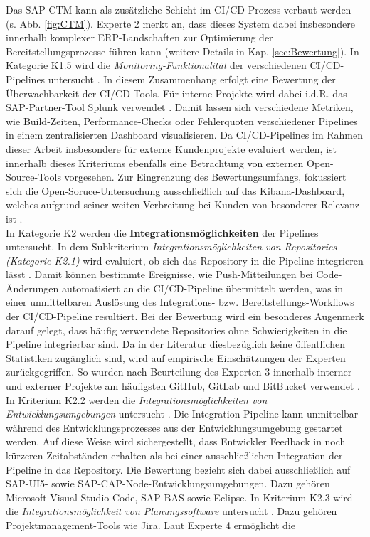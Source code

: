 Das SAP CTM kann als zusätzliche Schicht im CI/CD-Prozess verbaut werden (s. Abb. \ref{fig:CTM}). Experte 2 merkt an, dass dieses System dabei insbesondere innerhalb komplexer ERP-Landschaften zur Optimierung der Bereitstellungsprozesse führen kann (weitere Details in Kap. \ref{sec:Bewertung})\cite[Z. 65 ff.]{ProductManagerSAPHyperspaceCICD.}. In Kategorie K1.5 wird die \textit{Monitoring-Funktionalität} der verschiedenen CI/CD-Pipelines untersucht \cite[Z. 37 ff.]{ProductManagerSAPHyperspaceCICD.}. In diesem Zusammenhang erfolgt eine Bewertung der Überwachbarkeit der CI/CD-Tools. Für interne Projekte wird dabei i.d.R. das SAP-Partner-Tool Splunk verwendet \cite[Z. 74 ff.]{ProductManagerSAPHyperspaceCICD.}. Damit lassen sich verschiedene Metriken, wie Build-Zeiten, Performance-Checks oder Fehlerquoten verschiedener Pipelines in einem zentralisierten Dashboard visualisieren. Da CI/CD-Pipelines im Rahmen dieser Arbeit insbesondere für externe Kundenprojekte evaluiert werden, ist innerhalb dieses Kriteriums ebenfalls eine Betrachtung von externen Open-Source-Tools vorgesehen. Zur Eingrenzung des Bewertungsumfangs, fokussiert sich die Open-Soruce-Untersuchung ausschließlich auf das Kibana-Dashboard, welches aufgrund seiner weiten Verbreitung bei Kunden von besonderer Relevanz ist \cite[Z. 74 ff.]{ProductManagerSAPHyperspaceCICD.}.\\In Kategorie K2 werden die \textbf{Integrationsmöglichkeiten} der Pipelines untersucht. In dem Subkriterium \textit{Integrationsmöglichkeiten von Repositories (Kategorie K2.1)} wird evaluiert, ob sich das Repository in die Pipeline integrieren lässt \cite[Z. 89 ff.]{ProductOwnerSAPBTPProd&Infra.}. Damit können bestimmte Ereignisse, wie Push-Mitteilungen bei Code-Änderungen automatisiert an die CI/CD-Pipeline übermittelt werden, was in einer unmittelbaren Auslösung des Integrations- bzw. Bereitstellungs-Workflows der CI/CD-Pipeline resultiert. Bei der Bewertung wird ein besonderes Augenmerk darauf gelegt, dass häufig verwendete Repositories ohne Schwierigkeiten in die Pipeline integrierbar sind. Da in der Literatur diesbezüglich keine öffentlichen Statistiken zugänglich sind, wird auf empirische Einschätzungen der Experten zurückgegriffen. So wurden nach Beurteilung des Experten 3 innerhalb interner und externer Projekte am häufigsten GitHub, GitLab und BitBucket verwendet \cite[Z. 95 ff.]{TestDeveloperSAPHyperspaceAdoption&Onboarding.}. In Kriterium K2.2 werden die \textit{Integrationsmöglichkeiten von Entwicklungsumgebungen} untersucht \cite[Z. 93 ff.]{ProductOwnerSAPBTPProd&Infra.}. Die Integration-Pipeline kann unmittelbar während des Entwicklungsprozesses aus der Entwicklungsumgebung gestartet werden. Auf diese Weise wird sichergestellt, dass Entwickler Feedback in noch kürzeren Zeitabständen erhalten als bei einer ausschließlichen Integration der Pipeline in das Repository. Die Bewertung bezieht sich dabei ausschließlich auf SAP-UI5- sowie SAP-CAP-Node-Entwicklungsumgebungen. Dazu gehören Microsoft Visual Studio Code, \ac{SAP BAS} sowie Eclipse. In Kriterium K2.3 wird die \textit{Integrationsmöglichkeit von Planungssoftware} untersucht \cite[Z. 96 ff.]{TestDeveloperSAPHyperspaceAdoption&Onboarding.}. Dazu gehören Projektmanagement-Tools wie Jira. Laut Experte 4 ermöglicht die 